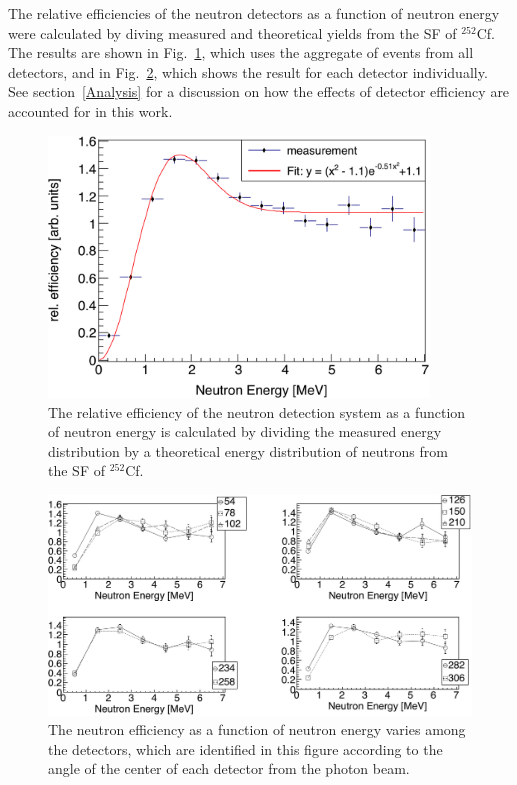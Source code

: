 The relative efficiencies of the neutron detectors as a function of neutron energy were calculated by diving measured and theoretical yields from the SF of $^{252}$Cf.
The results are shown in Fig.~\ref{fig:RelErgEfficiency}, which uses the aggregate of events from all detectors, and in Fig.~\ref{fig:RelErgEfficiencyVariation}, which shows the result for each detector individually.
See section~\ref{Analysis} for a discussion on how the effects of detector efficiency are accounted for in this work.
\begin{figure}[]
    \centering
    \includegraphics[width = 0.9\textwidth]{Content/Methods/RelErgEfficiency.png}
    \caption{The relative efficiency of the neutron detection system as a function of neutron energy is calculated by dividing the measured energy distribution by a theoretical energy distribution of neutrons from the SF of $^{252}$Cf.}
    \label{fig:RelErgEfficiency}
\end{figure}
\begin{figure}[]
    \centering
    \includegraphics[width = 1\textwidth]{Content/Methods/RelErgEfficiencyVariation.png}
    \caption{
    The neutron efficiency as a function of neutron energy varies among the detectors, which are identified in this figure according to the angle of the center of each detector from the photon beam. }
    \label{fig:RelErgEfficiencyVariation}
\end{figure}

